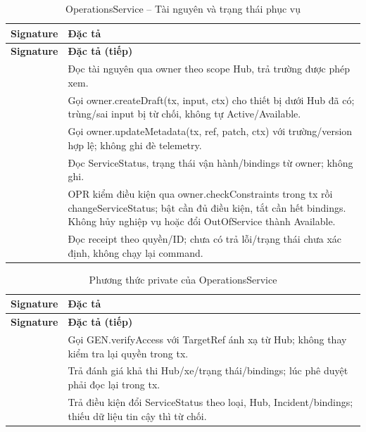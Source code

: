 \begin{longtable}{|L{58mm}|L{81mm}|}
\caption{OperationsService -- Tài nguyên và trạng thái phục vụ}\\\hline
\textbf{Signature} & \textbf{Đặc tả}\\\hline
\endfirsthead
\hline\textbf{Signature} & \textbf{Đặc tả (tiếp)}\\\hline\endhead
{} &
Đọc tài nguyên qua owner theo scope Hub, trả trường được phép xem.\\\hline
{} &
Gọi owner.createDraft(tx, input, ctx) cho thiết bị dưới Hub đã có; trùng/sai input bị từ chối, không tự Active/Available.\\\hline
{} &
Gọi owner.updateMetadata(tx, ref, patch, ctx) với trường/version hợp lệ; không ghi đè telemetry.\\\hline
{} &
Đọc ServiceStatus, trạng thái vận hành/bindings từ owner; không ghi.\\\hline
{} &
OPR kiểm điều kiện qua owner.checkConstraints trong tx rồi changeServiceStatus; bật cần đủ điều kiện, tắt cần hết bindings. Không hủy nghiệp vụ hoặc đổi OutOfService thành Available.\\\hline
{} &
Đọc receipt theo quyền/ID; chưa có trả lỗi/trạng thái chưa xác định, không chạy lại command.\\\hline
\end{longtable}

\begin{longtable}{|L{58mm}|L{81mm}|}
\caption{Phương thức private của OperationsService}\\\hline
\textbf{Signature} & \textbf{Đặc tả}\\\hline
\endfirsthead
\hline\textbf{Signature} & \textbf{Đặc tả (tiếp)}\\\hline\endhead
{} &
Gọi GEN.verifyAccess với TargetRef ánh xạ từ Hub; không thay kiểm tra lại quyền trong tx.\\\hline
{} &
Trả đánh giá khả thi Hub/xe/trạng thái/bindings; lúc phê duyệt phải đọc lại trong tx.\\\hline
{} &
Trả điều kiện đổi ServiceStatus theo loại, Hub, Incident/bindings; thiếu dữ liệu tin cậy thì từ chối.\\\hline
\end{longtable}

